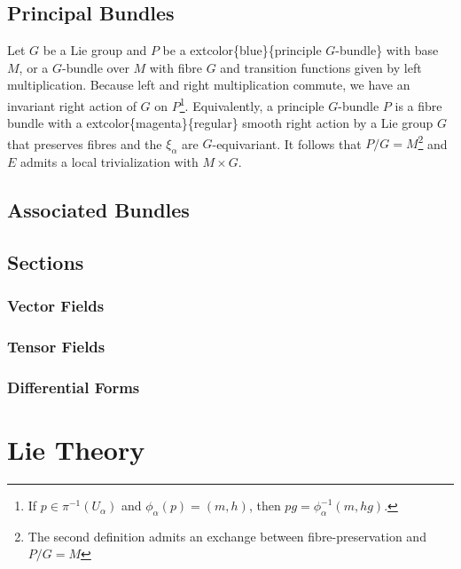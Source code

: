 \documentclass[
]{book}
\begin{document}
\hypertarget{principal-bundles}{%
\section{Principal Bundles}\label{principal-bundles}}

Let \(G\) be a Lie group and \(P\) be a extcolor\{blue\}\{principle \(G\)-bundle\} with base \(M\), or a \(G\)-bundle over \(M\) with fibre \(G\) and transition functions given by left multiplication. Because left and right multiplication commute, we have an invariant right action of \(G\) on \(P\)\footnote{If \(p \in \pi^{-1}(U_\alpha)\) and \(\phi_\alpha(p) = (m,h)\), then \(pg = \phi_\alpha^{-1}(m,hg)\).}. Equivalently, a principle \(G\)-bundle \(P\) is a fibre bundle with a extcolor\{magenta\}\{regular\} smooth right action by a Lie group \(G\) that preserves fibres and the \(\xi_\alpha\) are \(G\)-equivariant. It follows that \(P/G = M\)\footnote{The second definition admits an exchange between fibre-preservation and \(P/G = M\)} and \(E\) admits a local trivialization with \(M \times G\).

\hypertarget{associated-bundles}{%
\section{Associated Bundles}\label{associated-bundles}}

\hypertarget{sections}{%
\section{Sections}\label{sections}}

\hypertarget{vector-fields}{%
\subsection{Vector Fields}\label{vector-fields}}

\hypertarget{tensor-fields}{%
\subsection{Tensor Fields}\label{tensor-fields}}

\hypertarget{differential-forms}{%
\subsection{Differential Forms}\label{differential-forms}}

\hypertarget{lie-theory}{%
\chapter{Lie Theory}\label{lie-theory}}
\end{document}
